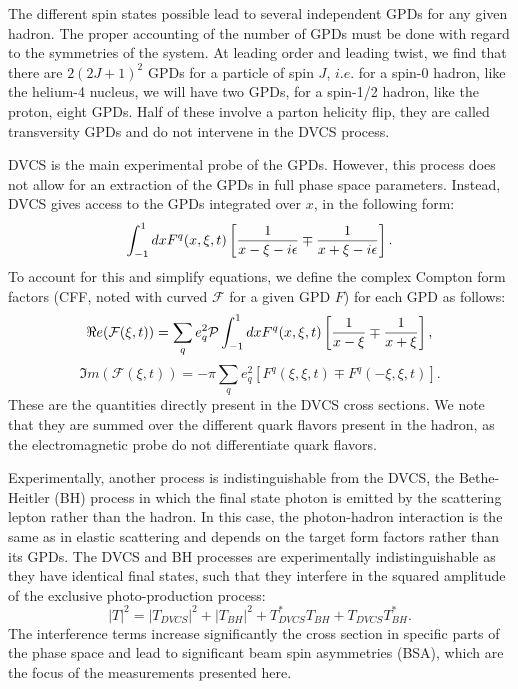 \documentclass[aps,prc,preprint,superscriptaddress]{revtex4}
\begin{document}
The different spin states possible lead to several independent GPDs for any 
given hadron. The proper accounting of the number of GPDs must be done with 
regard to the symmetries of the system. At leading order and leading twist, we 
find that there are $2(2J+1)^2$ GPDs for a particle of spin $J$, 
$i.e.$ for a spin-0 hadron, like the helium-4 nucleus, we will have two GPDs, 
for a spin-1/2 hadron, like the proton, eight GPDs. Half of these involve a 
parton helicity flip, they are called transversity GPDs and do not intervene 
in the DVCS process. 

DVCS is the main experimental probe of the GPDs. However, this process does not allow
for an extraction of the GPDs in full phase space parameters. Instead, DVCS gives access
to the GPDs integrated over $x$, in the following form:
\begin{equation}
	\int^1 _{-1} dx F^{q}(x,\xi,t) \left [ {1 \over x - \xi - i \epsilon} 
	                                   \mp {1 \over x + \xi - i \epsilon} \right]. 
\end{equation}
To account for this and simplify equations, we define the complex Compton form factors (CFF,
noted with curved $\mathcal{F}$ for a given GPD $F$) for each GPD as follows:
\begin{equation}
\Re e (\mathcal{F}(\xi,t)) = \sum _q e^2_q \mathcal{P} \int^1_{-1} dx F^{q}(x,\xi,t)
    \left [ {1 \over x - \xi} \mp {1 \over x + \xi} \right], 
\end{equation}
\begin{equation}
\Im m (\mathcal{F}(\xi,t)) = - \pi \sum _q e^2_q \left [ F^{q}(\xi,\xi,t) \mp F^{q}(-\xi,\xi,t) \right]. 
\end{equation} 
These are the quantities directly present in the DVCS cross sections. We note that they are summed over
the different quark flavors present in the hadron, as the electromagnetic probe do not differentiate
quark flavors.

Experimentally, another process is indistinguishable from the DVCS, the Bethe-Heitler (BH) 
process in which 
the final state photon is emitted by the scattering lepton rather than the hadron. In this case, the 
photon-hadron interaction is the same as in elastic scattering and depends on the
target form factors rather than its GPDs. The DVCS and BH processes are experimentally 
indistinguishable as they
have identical final states, such that they interfere in the squared amplitude of the
exclusive photo-production process:
\begin{equation}
|T|^2 = |T_{DVCS}|^2 + |T_{BH}|^2 + T_{DVCS}^* T_{BH} + T_{DVCS}T_{BH}^*. 
\end{equation}
The interference terms increase significantly the cross section in specific parts of the phase space
and lead to significant beam spin asymmetries (BSA), which are the focus of the measurements presented 
here. 
\end{document}
